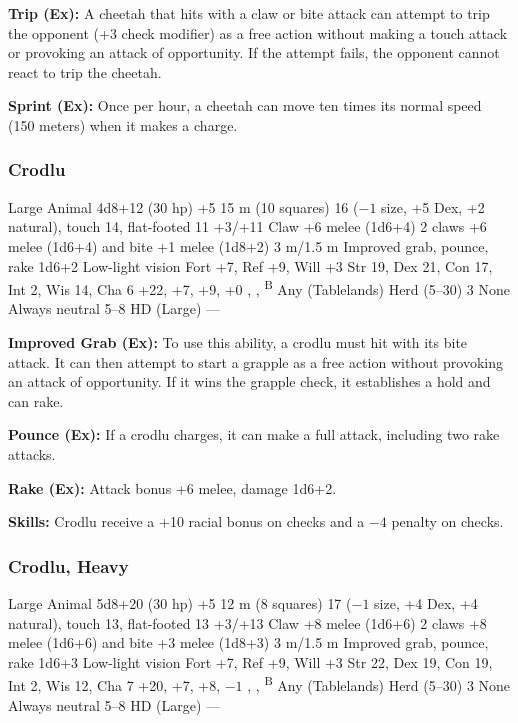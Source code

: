 \textbf{Trip (Ex):} A cheetah that hits with a claw or bite attack can attempt to trip the opponent (+3 check modifier) as a free action without making a touch attack or provoking an attack of opportunity. If the attempt fails, the opponent cannot react to trip the cheetah.

\textbf{Sprint (Ex):} Once per hour, a cheetah can move ten times its normal speed (150 meters) when it makes a charge.

\subsubsection{Crodlu}
\begin{MonsterStats}
{Large Animal}
{4d8+12 (30 hp)}
{+5}
{15 m (10 squares)}
{16 ($-1$ size, +5 Dex, +2 natural), touch 14, flat-footed 11}
{+3/+11}
{Claw +6 melee (1d6+4)}
{2 claws +6 melee (1d6+4) and bite +1 melee (1d8+2)}
{3 m/1.5 m}
{Improved grab, pounce, rake 1d6+2}
{Low-light vision}
{Fort +7, Ref +9, Will +3}
{Str 19, Dex 21, Con 17, Int 2, Wis 14, Cha 6}
{ +22,  +7,  +9,  +0}
{, , \textsuperscript{B}}
{Any (Tablelands)}
{Herd (5--30)}
{3}
{None}
{Always neutral}
{5--8 HD (Large)}
{---}
\end{MonsterStats}

\textbf{Improved Grab (Ex):} To use this ability, a crodlu must hit with its bite attack. It can then attempt to start a grapple as a free action without provoking an attack of opportunity. If it wins the grapple check, it establishes a hold and can rake.

\textbf{Pounce (Ex):} If a crodlu charges, it can make a full attack, including two rake attacks.

\textbf{Rake (Ex):} Attack bonus +6 melee, damage 1d6+2.

\textbf{Skills:} Crodlu receive a +10 racial bonus on  checks and a $-4$ penalty on  checks.

\subsubsection{Crodlu, Heavy}
\begin{MonsterStats}
{Large Animal}
{5d8+20 (30 hp)}
{+5}
{12 m (8 squares)}
{17 ($-1$ size, +4 Dex, +4 natural), touch 13, flat-footed 13}
{+3/+13}
{Claw +8 melee (1d6+6)}
{2 claws +8 melee (1d6+6) and bite +3 melee (1d8+3)}
{3 m/1.5 m}
{Improved grab, pounce, rake 1d6+3}
{Low-light vision}
{Fort +7, Ref +9, Will +3}
{Str 22, Dex 19, Con 19, Int 2, Wis 12, Cha 7}
{ +20,  +7,  +8,  $-1$}
{, , \textsuperscript{B}}
{Any (Tablelands)}
{Herd (5--30)}
{3}
{None}
{Always neutral}
{5--8 HD (Large)}
{---}
\end{MonsterStats}

